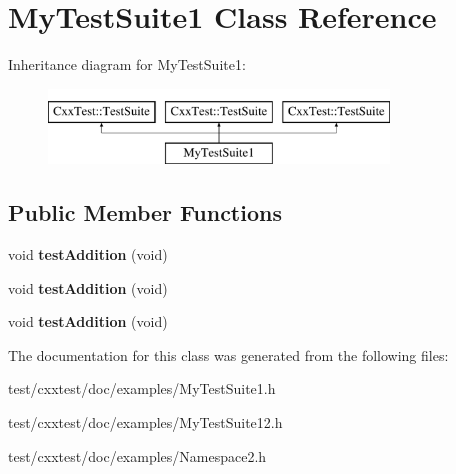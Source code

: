 \hypertarget{classMyTestSuite1}{\section{My\-Test\-Suite1 Class Reference}
\label{classMyTestSuite1}
}
Inheritance diagram for My\-Test\-Suite1\-:\begin{figure}[H]
\begin{center}
\leavevmode
\includegraphics[height=2.000000cm]{classMyTestSuite1}
\end{center}
\end{figure}
\subsection*{Public Member Functions}
\begin{DoxyCompactItemize}
\item 
\hypertarget{classMyTestSuite1_a61be839ee17b3a3405f0feaefc835efb}{void {\bfseries test\-Addition} (void)}\label{classMyTestSuite1_a61be839ee17b3a3405f0feaefc835efb}

\item 
\hypertarget{classMyTestSuite1_a61be839ee17b3a3405f0feaefc835efb}{void {\bfseries test\-Addition} (void)}\label{classMyTestSuite1_a61be839ee17b3a3405f0feaefc835efb}

\item 
\hypertarget{classMyTestSuite1_a61be839ee17b3a3405f0feaefc835efb}{void {\bfseries test\-Addition} (void)}\label{classMyTestSuite1_a61be839ee17b3a3405f0feaefc835efb}

\end{DoxyCompactItemize}


The documentation for this class was generated from the following files\-:\begin{DoxyCompactItemize}
\item 
test/cxxtest/doc/examples/My\-Test\-Suite1.\-h\item 
test/cxxtest/doc/examples/My\-Test\-Suite12.\-h\item 
test/cxxtest/doc/examples/Namespace2.\-h\end{DoxyCompactItemize}
